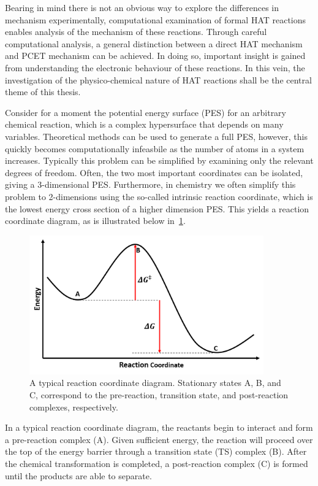 Bearing in mind there is not an obvious way to explore the differences in mechanism experimentally, computational examination of formal HAT reactions enables analysis of the mechanism of these reactions. Through careful computational analysis, a general distinction between a direct HAT mechanism and PCET mechanism can be achieved. In doing so, important insight is gained from understanding the electronic behaviour of these reactions. In this vein, the investigation of the physico-chemical nature of HAT reactions shall be the central theme of this thesis.

Consider for a moment the potential energy surface (PES) for an arbitrary chemical reaction, which is a complex hypersurface that depends on many variables. Theoretical methods can be used to generate a full PES, however, this quickly becomes computationally infeasbile as the number of atoms in a system increases. Typically this problem can be simplified by examining only the relevant degrees of freedom. Often, the two most important coordinates can be isolated, giving a 3-dimensional PES. Furthermore, in chemistry we often simplify this problem to 2-dimensions using the so-called intrinsic reaction coordinate, which is the lowest energy cross section of a higher dimension PES. This yields a reaction coordinate diagram, as is illustrated below in~\ref{fig:pes}.

\begin{figure}[htb]
  \centering
  \includegraphics[width=0.9\textwidth]{figures/pes}
  \caption[A typical reaction coordinate diagram.]{A typical reaction coordinate diagram. Stationary states A, B, and C, correspond to the pre-reaction, transition state, and post-reaction complexes, respectively.}
\label{fig:pes}
\end{figure}

In a typical reaction coordinate diagram, the reactants begin to interact and form a pre-reaction complex (A). Given sufficient energy, the reaction will proceed over the top of the energy barrier through a transition state (TS) complex (B). After the chemical transformation is completed, a post-reaction complex (C) is formed until the products are able to separate.


